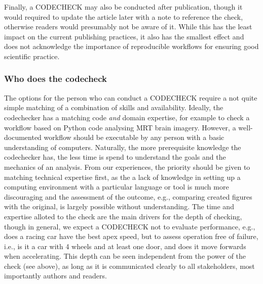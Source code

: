 \documentclass[12pt]{article}
\begin{document}
Finally, a CODECHECK may also be conducted after publication, though it
would required to update the article later with a note to reference the check,
otherwise readers would presumably not be aware of it. While this has the
least impact on the current publishing practices, it also has the smallest
effect and does not acknowledge the importance of reproducible workflows for
ensuring good scientific practice.

\subsubsection*{Who does the codecheck}\label{who-does-the-codecheck}

The options for the person who can conduct a CODECHECK require a not quite
simple matching of a combination of skills and availability. Ideally, the
codechecker has a matching code \emph{and} domain expertise, for example to
check a workflow based on Python code analysing MRT brain imagery. However,
a well-documented workflow should be executable by any person with a basic
understanding of computers. Naturally, the more prerequisite knowledge the
codechecker has, the less time is spend to understand the goals and 
the mechanics of an analysis. From our experiences, the priority should be
given to matching technical expertise first, as the a lack of knowledge in
setting  up a computing environment with a particular language or tool is 
much more discouraging and the assessment of the outcome, e.g., comparing
created figures with the original, is largely possible without 
understanding.
The time and expertise alloted to the check
are the main drivers for the depth of checking, though in general, we 
expect a CODECHECK not to evaluate performance, e.g., does a racing car
have the best apex speed, but to assess operation free of failure, i.e., 
is it a car with 4 wheels and at least one door, and does it move forwards
when accelerating. This depth can be seen independent from the power of
the check (see above), as long as it is communicated clearly to all
stakeholders, most importantly authors and readers.
\end{document}
